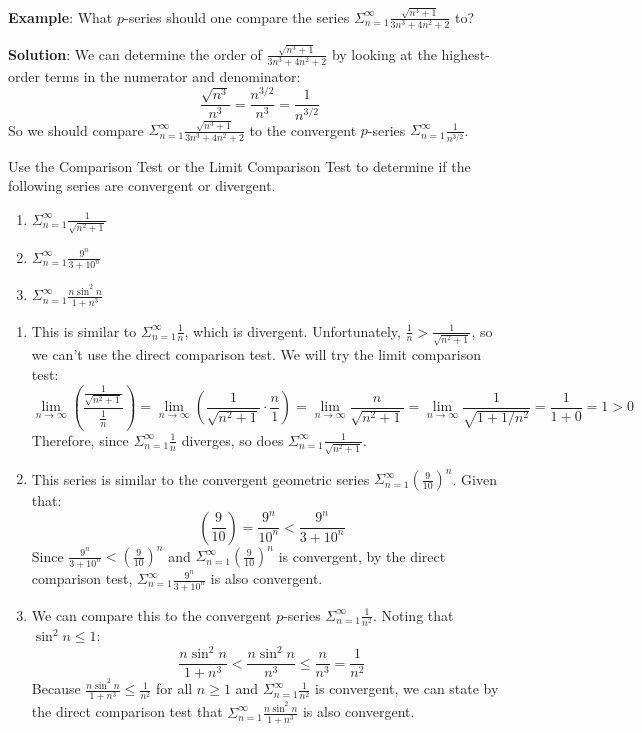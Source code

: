 \textbf{Example}: What $p$-series should one compare the series $\Sigma_{n=1}^\infty \frac{\sqrt{n^3 + 1}}{3n^3 + 4n^2 + 2}$ to?

\textbf{Solution}: We can determine the order of $\frac{\sqrt{n^3 + 1}}{3n^3 + 4n^2 + 2}$ by looking at the highest-order terms in the numerator and denominator:
$$\frac{\sqrt{n^3}}{n^3} = \frac{n^{3/2}}{n^3} = \frac{1}{n^{3/2}}$$
So we should compare $\Sigma_{n=1}^\infty \frac{\sqrt{n^3 + 1}}{3n^3 + 4n^2 + 2}$ to the convergent $p$-series $\Sigma_{n=1}^\infty \frac{1}{n^{3/2}}$.

\begin{Exercise}[label = comp1]
Use the Comparison Test or the Limit Comparison Test to determine if the following series are convergent or divergent. 
\begin{enumerate}
\item $\Sigma_{n=1}^\infty \frac{1}{\sqrt{n^2 + 1}}$
\item $\Sigma_{n=1}^\infty \frac{9^n}{3 + 10^n}$
\item $\Sigma_{n=1}^\infty \frac{n \sin^2{n}}{1 + n^3}$
\end{enumerate}
\end{Exercise}

\begin{Answer}[ref = comp1]
\begin{enumerate}
\item This is similar to $\Sigma_{n=1}^\infty \frac{1}{n}$, which is divergent. Unfortunately, $\frac{1}{n} > \frac{1}{\sqrt{n^2 + 1}}$, so we can't use the 
direct comparison test. We will try the limit comparison test:
$$\lim_{n \to \infty} \left( \frac{\frac{1}{\sqrt{n^2 + 1}}}{\frac{1}{n}} 
\right) = \lim_{n \to \infty} \left( \frac{1}{\sqrt{n^2 + 1}} \cdot \frac{n}{1} 
\right) = \lim_{n \to \infty} \frac{n}{\sqrt{n^2 + 1}} = \lim_{n \to \infty} 
\frac{1}{\sqrt{1 + 1/n^2}} = \frac{1}{1+ 0} = 1 > 0$$
Therefore, since $\Sigma_{n=1}^\infty \frac{1}{n}$ diverges, so does $\Sigma_
{n=1}^\infty \frac{1}{\sqrt{n^2 + 1}}$.
\item This series is similar to the convergent geometric series $\Sigma_{n=1}^
\infty \left( \frac{9}{10} \right)^n$. Given that:
$$\left( \frac{9}{10} \right) = \frac{9^n}{10^n} < \frac{9^n}{3 + 10^n}$$
Since $\frac{9^n}{3 + 10^n} < \left( \frac{9}{10} \right)^n$ and $\Sigma_{n=1}
^\infty \left( \frac{9}{10} \right)^n$ is convergent, by the direct comparison 
test, $\Sigma_{n=1}^\infty \frac{9^n}{3 + 10^n}$ is also convergent. 
\item We can compare this to the convergent $p$-series $\Sigma_{n=1}^\infty \frac{1}{n^2}$. Noting that $\sin^2{n} \leq 1$:
$$\frac{n \sin^2{n}}{1 + n^3} < \frac{n \sin^2{n}}{n^3} \leq \frac{n}{n^3} = \frac{1}{n^2}$$
Because $\frac{n \sin^2{n}}{1 + n^3} \leq \frac{1}{n^2}$ for all $n \geq 1$ and $\Sigma_{n=1}^\infty \frac{1}{n^2}$ is convergent, we can state by the direct comparison test that $\Sigma_{n=1}^\infty \frac{n \sin^2{n}}{1 + n^3}$ is also convergent. 
\end{enumerate}
\end{Answer}

